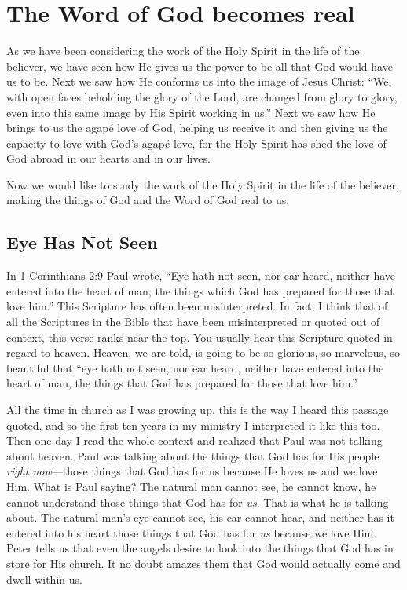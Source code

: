 \chapter{The Word of God becomes real}

As we have been considering the work of the Holy Spirit 
in the life of the believer, we have seen how He gives us 
the power to be all that God would have us to be. Next we 
saw how He conforms us into the image of Jesus Christ: 
“We, with open faces beholding the glory of the Lord, are 
changed from glory to glory, even into this same image by 
His Spirit working in us.” Next we saw how He brings to us 
the agapé love of God, helping us receive it and then giving 
us the capacity to love with God’s agapé love, for the Holy 
Spirit has shed the love of God abroad in our hearts and in 
our lives.

Now we would like to study the work of the Holy Spirit 
in the life of the believer, making the things of God and the 
Word of God real to us.


\section*{Eye Has Not Seen}

In 1 Corinthians 2:9 Paul wrote, “Eye hath not seen, nor 
ear heard, neither have entered into the heart of man, the 
things which God has prepared for those that love him.” 
This Scripture has often been misinterpreted. In fact, I think 
that of all the Scriptures in the Bible that have been misinterpreted or quoted out of context, this verse ranks near 
the top. You usually hear this Scripture quoted in regard 
to heaven. Heaven, we are told, is going to be so glorious, 
so marvelous, so beautiful that “eye hath not seen, nor ear 
heard, neither have entered into the heart of man, the things 
that God has prepared for those that love him.”

All the time in church as I was growing up, this is the 
way I heard this passage quoted, and so the first ten years 
in my ministry I interpreted it like this too. Then one day I 
read the whole context and realized that Paul was not talking about heaven. Paul was talking about the things that 
God has for His people  \emph{right now}—those things that God 
has for us because He loves us and we love Him. What is 
Paul saying? The natural man cannot see, he cannot know, 
he cannot understand those things that God has for \emph{us}. That 
is what he is talking about. The natural man’s eye cannot 
see, his ear cannot hear, and neither has it entered into his 
heart those things that God has for \emph{us} because we love Him. 
Peter tells us that even the angels desire to look into the 
things that God has in store for His church. It no doubt 
amazes them that God would actually come and dwell 
within us.

